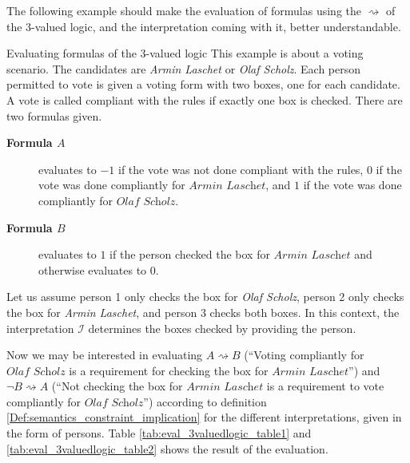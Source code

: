 The following example should make the evaluation of formulas using the $\rightsquigarrow$ of the 3-valued logic, and the interpretation coming with it, better understandable.

\begin{Bsp}{Evaluating formulas of the 3-valued logic}{}
    This example is about a voting scenario. The candidates are \textit{Armin Laschet} or \textit{Olaf Scholz}. Each person permitted to vote is given a voting form with two boxes, one for each candidate. A vote is called compliant with the rules if exactly one box is checked. There are two formulas given. 
    \begin{description}
        \item[\textbf{Formula $A$}] evaluates to $-1$ if the vote was not done compliant with the rules, $0$ if the vote was done compliantly for $\textit{Armin Laschet}$, and $1$ if the vote was done compliantly for $\textit{Olaf Scholz}$. 
        \item[\textbf{Formula $B$}] evaluates to $1$ if the person checked the box for $\textit{Armin Laschet}$ and otherwise evaluates to $0$.
    \end{description}

    Let us assume person 1 only checks the box for \textit{Olaf Scholz}, person 2 only checks the box for \textit{Armin Laschet}, and person 3 checks both boxes. In this context, the interpretation $\mathcal{I}$ determines the boxes checked by providing the person. 
    
    Now we may be interested in evaluating $A \rightsquigarrow B$ (``Voting compliantly for $\textit{Olaf Scholz}$ is a requirement for checking the box for $\textit{Armin Laschet}$'') and $\neg B \rightsquigarrow A$ (``Not checking the box for $\textit{Armin Laschet}$ is a requirement to vote compliantly for $\textit{Olaf Scholz}$'') according to definition \ref{Def:semantics_constraint_implication} for the different interpretations, given in the form of persons. Table \ref{tab:eval_3valuedlogic_table1} and \ref{tab:eval_3valuedlogic_table2} shows the result of the evaluation. 


\end{Bsp}
